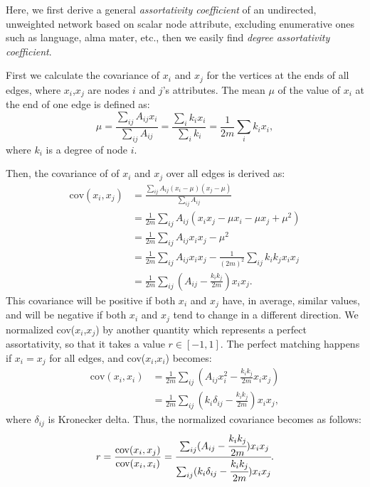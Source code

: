 \documentclass{article}
\begin{document}
	Here, we first derive a general \textit{assortativity coefficient} of an undirected, unweighted network based on scalar node attribute, excluding enumerative ones such as language, alma mater, etc., then we easily find \textit{degree assortativity coefficient}.
	
	First we calculate the covariance of $x_i$ and $x_j$ for the vertices at the ends of all edges, where $x_i$,$x_j$ are nodes $i$ and $j$'s attributes.
	The mean $\mu$ of the value of $x_i$ at the end of one edge is defined as:
	\begin{equation}
	\mu = \frac{ \sum_{ij}A_{ij}x_i }{\sum_{ij}A_{ij}} = \frac{\sum_i k_i x_i}{\sum_i k_i} = \frac{1}{2m}\sum_i k_i x_i,
	\end{equation}
where $k_i$ is a degree of node $i$.

Then, the covariance of of $x_i$ and $x_j$ over all edges is derived as:
	\begin{equation}
	\begin{split}
	\text{cov}(x_i, x_j)  &= \frac
					{ \sum_{ij}A_{ij}(x_i - \mu)(x_j - \mu) }
					{\sum_{ij}A_{ij} } \\
					&= \frac{1}{2m}\sum_{ij}A_{ij} (x_i x_j - \mu x_i - \mu x_j +\mu^2) \\
					&= \frac{1}{2m}\sum_{ij}A_{ij}x_i x_j - \mu^2 \\
					&= \frac{1}{2m}\sum_{ij}A_{ij}x_i x_j - \frac{1}{(2m)^2}\sum_{ij}k_i k_j x_i x_j \\
					&= \frac{1}{2m}\sum_{ij}(A_{ij} - \frac{k_i k_j}{2m})x_i x_j.
	\end{split}
	\end{equation}
This covariance will be positive if both $x_i$ and $x_j$ have, in average, similar values, and will be negative if both $x_i$ and $x_j$ tend to change in a different direction. We normalized cov($x_i$,$x_j$) by another quantity which represents a perfect assortativity, so that it takes a value $r \in [-1 ,1]$. The perfect matching happens if $x_i = x_j$ for all edges, and cov($x_i$,$x_i$) becomes:
	\begin{equation}
	\begin{split}
	 \text{cov}(x_i, x_i) &=  \frac{1}{2m}\sum_{ij}(A_{ij} x_i^2 - \frac{k_i k_j}{2m} x_i x_j) \\
	 		             &=  \frac{1}{2m}\sum_{ij}(k_i \delta_{ij} - \frac{k_i k_j}{2m}) x_i x_j,
	\end{split}
	\end{equation}
	where $\delta_{ij}$ is Kronecker delta.
Thus, the normalized covariance becomes as follows:
	\begin{equation}
	\begin{split}
	 r = \frac{ \text{cov}(x_i, x_j)}{ \text{cov}(x_i, x_i)} = 
	 \cfrac{\sum_{ij}(A_{ij} - \cfrac{k_i k_j}{2m})x_i x_j}{\sum_{ij}(k_i \delta_{ij} - \cfrac{k_i k_j}{2m}) x_i x_j}.
	\end{split}
	\end{equation}
\end{document}
